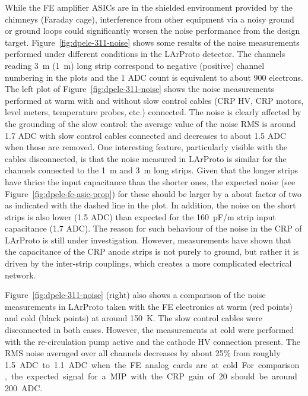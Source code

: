 While the FE amplifier ASICs are in the shielded environment provided by the chimneys (Faraday cage), interference from other equipment via a noisy ground or ground loops could significantly worsen the noise performance from the design target. Figure~\ref{fig:dpele-311-noise} shows some results of the noise measurements performed under different conditions in the LArProto detector. The channels reading \SI{3}{\meter} (\SI{1}{\metre}) long strip correspond to negative (positive) channel numbering in the plots and the 1 ADC count is equivalent to about 900 electrons. The left plot of Figure~\ref{fig:dpele-311-noise} shows the noise measurements performed at warm with and without slow control cables (CRP HV, CRP motors, level meters, temperature probes, etc.) connected. The noise is clearly affected by the grounding of the slow control: the average value of the noise RMS is around \num{1.7} ADC with slow control cables connected and decreases to about \num{1.5} ADC when those are removed. One interesting feature, particularly visible with the cables disconnected, is that the noise measured in LArProto is similar for the channels connected to the \SI{1}{\meter} and \SI{3}{\meter} long strips. Given that the longer strips have thrice the input capacitance than the shorter ones, the expected noise (see Figure~\ref{fig:dpele-fe-asic-prop}) for these should be larger by a about factor of two as indicated with the dashed line in the plot. In addition, the noise on the short strips is also lower (\num{1.5} ADC) than expected for the \SI{160}{pF/m} strip input capacitance (1.7 ADC). The reason for such behaviour of the noise in the CRP of LArProto is still under investigation. However, measurements have shown that the capacitance of the CRP anode strips is not purely to ground, but rather it is driven by the inter-strip couplings, which creates a more complicated electrical network. 

Figure~\ref{fig:dpele-311-noise} (right) also shows a comparison of the noise measurements in LArProto taken with the FE electronics at warm (red points) and cold (black points) at around \SI{150}{\kelvin}. The slow control cables were disconnected in both cases. However, the measurements at cold were performed with the re-circulation pump active and the cathode HV connection present. The RMS noise averaged over all channels decreases by about 25\% from roughly \SI{1.5} ADC to \SI{1.1} ADC when the FE analog cards are at cold. For comparison, the expected signal for a MIP with the CRP gain of 20 should be around \num{200} ADC. 

